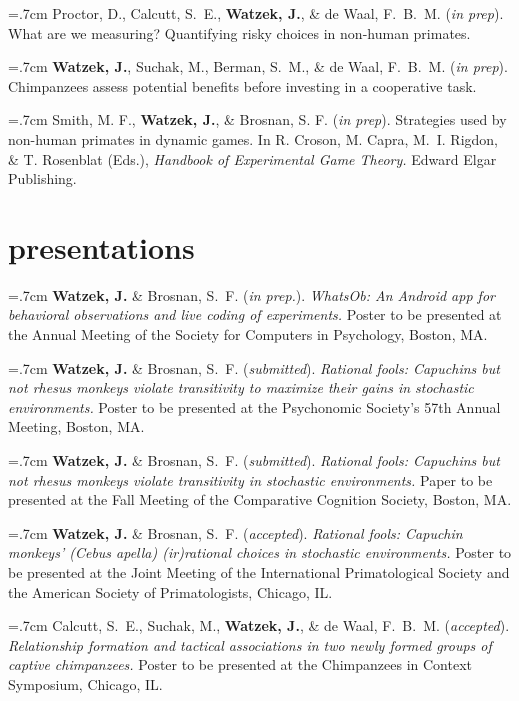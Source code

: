 \documentclass[]{friggeri-cv}
\begin{document}
\hangindent=.7cm Proctor, D., Calcutt, S.~E., \textbf{Watzek, J.}, \& de Waal, F.~B.~M. (\emph{in prep}). What are we measuring? Quantifying risky choices in non-human primates.

\hangindent=.7cm \textbf{Watzek, J.}, Suchak, M., Berman, S.~M., \& de Waal, F.~B.~M. (\emph{in prep}). Chimpanzees assess potential benefits before investing in a cooperative task.

\hangindent=.7cm Smith, M. F., \textbf{Watzek, J.}, \& Brosnan, S. F. (\emph{in prep}). Strategies used by non-human primates in dynamic games. In R. Croson, M. Capra, M.~I. Rigdon, \& T. Rosenblat (Eds.), \emph{Handbook of Experimental Game Theory.} Edward Elgar Publishing. \\[-.1cm]

\section{presentations}

\hangindent=.7cm \textbf{Watzek, J.} \& Brosnan, S.~F. (\emph{in prep.}). \emph{WhatsOb: An Android app for behavioral observations and live coding of experiments.} Poster to be presented at the Annual Meeting of the Society for Computers in Psychology, Boston, MA.

\hangindent=.7cm \textbf{Watzek, J.} \& Brosnan, S.~F. (\emph{submitted}). \emph{Rational fools: Capuchins but not rhesus monkeys violate transitivity to maximize their gains in stochastic environments.} Poster to be presented at the Psychonomic Society's 57th Annual Meeting, Boston, MA.

\hangindent=.7cm \textbf{Watzek, J.} \& Brosnan, S.~F. (\emph{submitted}). \emph{Rational fools: Capuchins but not rhesus monkeys violate transitivity in stochastic environments.} Paper to be presented at the Fall Meeting of the Comparative Cognition Society, Boston, MA.

\hangindent=.7cm \textbf{Watzek, J.} \& Brosnan, S.~F. (\emph{accepted}). \emph{Rational fools: Capuchin monkeys' (\emph{Cebus apella}) (ir)rational choices in stochastic environments.} Poster to be presented at the Joint Meeting of the International Primatological Society and the American Society of Primatologists, Chicago, IL.

\hangindent=.7cm Calcutt, S.~E., Suchak, M., \textbf{Watzek, J.}, \& de Waal, F.~B.~M. (\emph{accepted}). \emph{Relationship formation and tactical associations in two newly formed groups of captive chimpanzees.} Poster to be presented at the Chimpanzees in Context Symposium, Chicago, IL.
\end{document}

